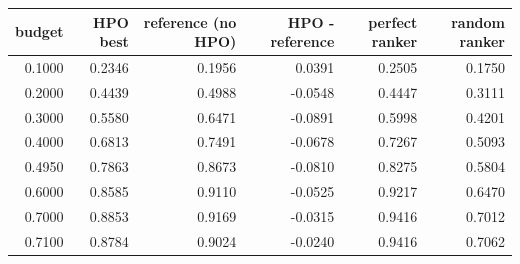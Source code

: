 \begin{tabular}{rrrrrr}
\toprule
 budget &  HPO best &  reference (no HPO) &  HPO - reference &  perfect ranker &  random ranker \\
\midrule
 0.1000 &    0.2346 &              0.1956 &           0.0391 &          0.2505 &         0.1750 \\
 0.2000 &    0.4439 &              0.4988 &          -0.0548 &          0.4447 &         0.3111 \\
 0.3000 &    0.5580 &              0.6471 &          -0.0891 &          0.5998 &         0.4201 \\
 0.4000 &    0.6813 &              0.7491 &          -0.0678 &          0.7267 &         0.5093 \\
 0.4950 &    0.7863 &              0.8673 &          -0.0810 &          0.8275 &         0.5804 \\
 0.6000 &    0.8585 &              0.9110 &          -0.0525 &          0.9217 &         0.6470 \\
 0.7000 &    0.8853 &              0.9169 &          -0.0315 &          0.9416 &         0.7012 \\
 0.7100 &    0.8784 &              0.9024 &          -0.0240 &          0.9416 &         0.7062 \\
\bottomrule
\end{tabular}
